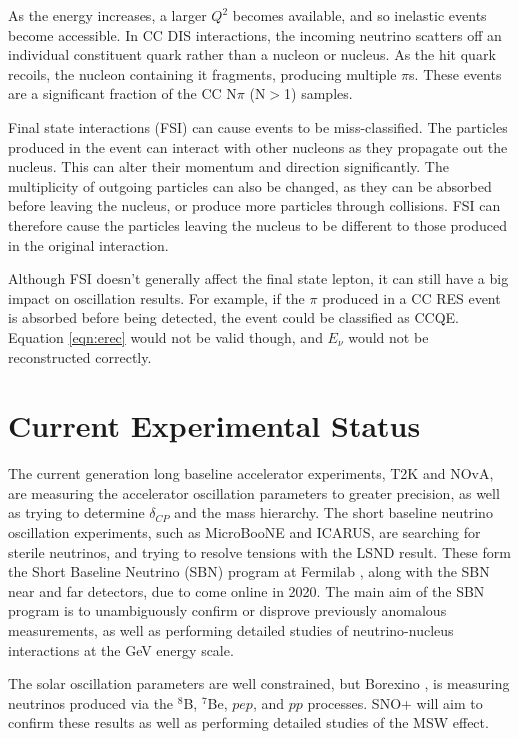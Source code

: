 As the energy increases, a larger $Q^2$ becomes available, and so inelastic events become accessible. In CC DIS interactions, the incoming neutrino scatters off an individual constituent quark rather than a nucleon or nucleus. As the hit quark recoils, the nucleon containing it fragments, producing multiple $\pi$s. These events are a significant fraction of the CC N$\pi$ (N$>$1) samples.

Final state interactions (FSI) can cause events to be miss-classified. The particles produced in the event can interact with other nucleons as they propagate out the nucleus. This can alter their momentum and direction significantly. The multiplicity of outgoing particles can also be changed, as they can be absorbed before leaving the nucleus, or produce more particles through collisions. FSI can therefore cause the particles leaving the nucleus to be different to those produced in the original interaction.

Although FSI doesn't generally affect the final state lepton, it can still have a big impact on oscillation results. For example, if the $\pi$ produced in a CC RES event is absorbed before being detected, the event could be classified as CCQE. Equation \eqref{eqn:erec} would not be valid though, and $E_\nu$ would not be reconstructed correctly. 

\section{Current Experimental Status}\label{sec:status}

The current generation long baseline accelerator experiments, T2K and NOvA, are measuring the accelerator oscillation parameters to greater precision, as well as trying to determine $\delta_{CP}$ and the mass hierarchy. The short baseline neutrino oscillation experiments, such as MicroBooNE \cite{microboone} and ICARUS, are searching for sterile neutrinos, and trying to resolve tensions with the LSND result. These form the Short Baseline Neutrino (SBN) program at Fermilab \cite{sbn}, along with the SBN near and far detectors, due to come online in 2020. The main aim of the SBN program is to unambiguously confirm or disprove previously anomalous measurements, as well as performing detailed studies of neutrino-nucleus interactions at the GeV energy scale.

The solar oscillation parameters are well constrained, but Borexino \cite{borexino}, is measuring neutrinos produced via the $^8$B, $^7$Be, $pep$, and $pp$ processes. SNO+ \cite{snoplus} will aim to confirm these results as well as performing detailed studies of the MSW effect.

